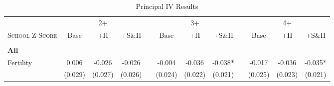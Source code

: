 \begin{landscape}\begin{table}[htpb!]\caption{Principal IV Results}
\label{TWINtab:IVAll}
\begin{center}\begin{tabular}{lcccp{2mm}cccp{2mm}ccc}
\toprule \toprule 
&\multicolumn{3}{c}{2+}&&\multicolumn{3}{c}{3+}&&\multicolumn{3}{c}{4+}\\ \cmidrule(r){2-4} \cmidrule(r){6-8} \cmidrule(r){10-12} 
\textsc{School Z-Score}&Base&+H&+S\&H&&Base&+H&+S\&H&&Base&+H&+S\&H\\ \midrule 
\begin{footnotesize}\end{footnotesize}& 
\begin{footnotesize}\end{footnotesize}& 
\begin{footnotesize}\end{footnotesize}& 
\begin{footnotesize}\end{footnotesize}& 
\begin{footnotesize}\end{footnotesize}& 
\begin{footnotesize}\end{footnotesize}& 
\begin{footnotesize}\end{footnotesize}& 
\begin{footnotesize}\end{footnotesize}& 
\begin{footnotesize}\end{footnotesize}& 
\begin{footnotesize}\end{footnotesize}& 
\begin{footnotesize}\end{footnotesize}& 
\begin{footnotesize}\end{footnotesize}\\ 
\multicolumn{12}{l}{\textbf{All}}\\ 
Fertility&0.006&-0.026&-0.026&&-0.004&-0.036&-0.038*&&-0.017&-0.036&-0.035*\\
&(0.029)&(0.027)&(0.026)&&(0.024)&(0.022)&(0.021)&&(0.025)&(0.023)&(0.021)\\

\end{tabular}
\end{center}
\end{table}
\end{landscape}
